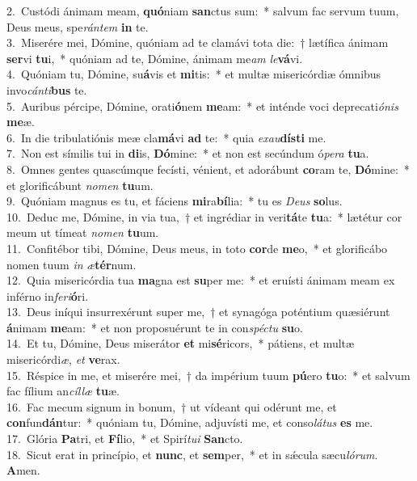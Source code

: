 {2.~}Custódi ánimam meam, \textbf{quó}niam \textbf{san}ctus sum:~* salvum fac servum tuum, Deus meus, spe\textit{rán}\textit{tem} \textbf{in} te.\\
{3.~}Miserére mei, Dómine, quóniam ad te clamávi tota die:~† lætífica ánimam \textbf{ser}vi \textbf{tu}i,~* quóniam ad te, Dómine, ánimam me\textit{am} \textit{le}\textbf{vá}vi.\\
{4.~}Quóniam tu, Dómine, su\textbf{á}vis et \textbf{mi}tis:~* et multæ misericórdiæ ómnibus invo\textit{cán}\textit{ti}\textbf{bus} te.\\
{5.~}Auribus pércipe, Dómine, orati\textbf{ó}nem \textbf{me}am:~* et inténde voci deprecati\textit{ó}\textit{nis} \textbf{me}æ.\\
{6.~}In die tribulatiónis meæ cla\textbf{má}vi \textbf{ad} te:~* quia \textit{e}\textit{xau}\textbf{dí}\textbf{sti} me.\\
{7.~}Non est símilis tui in \textbf{di}is, \textbf{Dó}mine:~* et non est secúndum ó\textit{pe}\textit{ra} \textbf{tu}a.\\
{8.~}Omnes gentes quascúmque fecísti, vénient, et adorábunt \textbf{co}ram te, \textbf{Dó}mine:~* et glorificábunt \textit{no}\textit{men} \textbf{tu}um.\\
{9.~}Quóniam magnus es tu, et fáciens \textbf{mi}ra\textbf{bí}lia:~* tu es \textit{De}\textit{us} \textbf{so}lus.\\
{10.~}Deduc me, Dómine, in via tua,~† et ingrédiar in veri\textbf{tá}te \textbf{tu}a:~* lætétur cor meum ut tímeat \textit{no}\textit{men} \textbf{tu}um.\\
{11.~}Confitébor tibi, Dómine, Deus meus, in toto \textbf{cor}de \textbf{me}o,~* et glorificábo nomen tuum \textit{in} \textit{æ}\textbf{tér}num.\\
{12.~}Quia misericórdia tua \textbf{ma}gna est \textbf{su}per me:~* et eruísti ánimam meam ex inférno in\textit{fe}\textit{ri}\textbf{ó}ri.\\
{13.~}Deus iníqui insurrexérunt super me,~† et synagóga poténtium quæsiérunt \textbf{á}nimam \textbf{me}am:~* et non proposuérunt te in con\textit{spé}\textit{ctu} \textbf{su}o.\\
{14.~}Et tu, Dómine, Deus miserátor \textbf{et} mi\textbf{sé}ricors,~* pátiens, et multæ misericórdi\textit{æ}, \textit{et} \textbf{ve}rax.\\
{15.~}Réspice in me, et miserére mei,~† da impérium tuum \textbf{pú}ero \textbf{tu}o:~* et salvum fac fílium an\textit{cíl}\textit{læ} \textbf{tu}æ.\\
{16.~}Fac mecum signum in bonum,~† ut vídeant qui odérunt me, et \textbf{con}fun\textbf{dán}tur:~* quóniam tu, Dómine, adjuvísti me, et conso\textit{lá}\textit{tus} \textbf{es} me.\\
{17.~}Glória \textbf{Pa}tri, et \textbf{Fí}lio,~* et Spirí\textit{tu}\textit{i} \textbf{San}cto.\\
{18.~}Sicut erat in princípio, et \textbf{nunc}, et \textbf{sem}per,~* et in sǽcula sæcu\textit{ló}\textit{rum}. \textbf{A}men.\\
